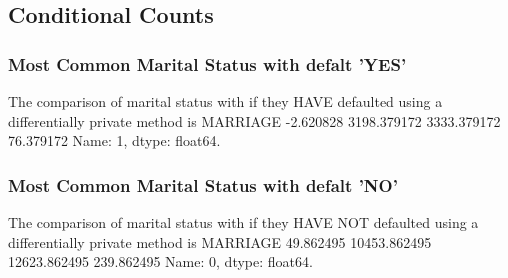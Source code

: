 \documentclass{article}%
\begin{document}
%
\subsection{Conditional Counts}%
\label{subsec:ConditionalCounts}%
\subsubsection{Most Common Marital Status with defalt 'YES'}%
\label{ssubsec:MostCommonMaritalStatuswithdefaltYES}%
The comparison of marital status with if they HAVE defaulted using a differentially private method is MARRIAGE      {-}2.620828    3198.379172    3333.379172      76.379172\newline%
Name: 1, dtype: float64.

%
\subsubsection{Most Common Marital Status with defalt 'NO'}%
\label{ssubsec:MostCommonMaritalStatuswithdefaltNO}%
The comparison of marital status with if they HAVE NOT defaulted using a differentially private method is MARRIAGE       49.862495    10453.862495    12623.862495      239.862495\newline%
Name: 0, dtype: float64.

%
\end{document}
